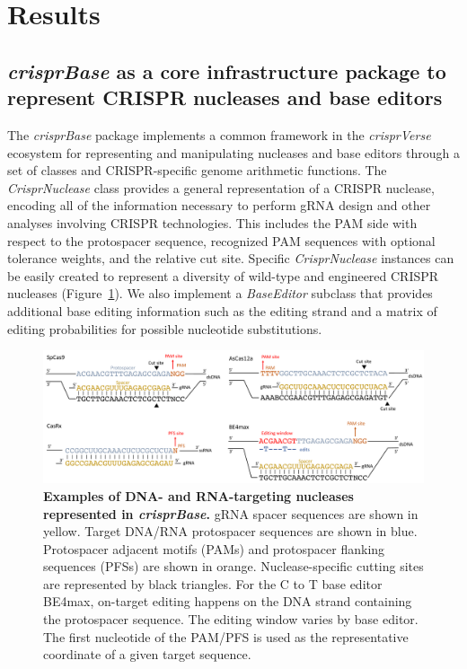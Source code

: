 \documentclass[pdftex,english,10pt]{article}
\begin{document}
\section{Results}


\subsection{\textit{crisprBase} as a core infrastructure package to represent CRISPR nucleases and base editors}

The \textit{crisprBase} package implements a common framework in the \textit{crisprVerse} ecosystem for representing and manipulating nucleases and base editors through a set of classes and CRISPR-specific genome arithmetic functions. The \textit{CrisprNuclease} class provides a general representation of a CRISPR nuclease, encoding all of the information necessary to perform gRNA design and other analyses involving CRISPR technologies. This includes the PAM side with respect to the protospacer sequence, recognized PAM sequences with optional tolerance weights, and the relative cut site. Specific \textit{CrisprNuclease} instances can be easily created to represent a diversity of wild-type and engineered CRISPR nucleases (Figure~\ref{fig:nucleases}). We also implement a \textit{BaseEditor} subclass that provides additional base editing information such as the editing strand and a matrix of editing probabilities for possible nucleotide substitutions.

\begin{figure}[!h]
\centering
\includegraphics[width=1\textwidth]{figures/nucleases/nucleases.pdf}
  \caption{\textbf{Examples of DNA- and RNA-targeting nucleases represented in \textit{crisprBase}.} gRNA spacer sequences are shown in yellow. Target DNA/RNA protospacer sequences are shown in blue. Protospacer adjacent motifs (PAMs) and protospacer flanking sequences (PFSs) are shown in orange. Nuclease-specific cutting sites are represented by black triangles. For the C to T base editor BE4max, on-target editing happens on the DNA strand containing the protospacer sequence. The editing window varies by base editor. The first nucleotide of the PAM/PFS is used as the representative coordinate of a given target sequence. 
  }
  \label{fig:nucleases}
\end{figure}
\end{document}
